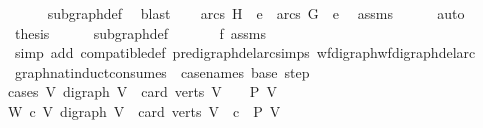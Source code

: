 \begin{isabellebody}
\ \ \ \ \isamarkupfalse%
\ subgraph{\isacharunderscore}{\kern0pt}def\ \isamarkupfalse%
\ blast\isanewline
\ \ \isamarkupfalse%
\ {\isachardoublequoteopen}arcs\ H\ {\isacharminus}{\kern0pt}\ {\isacharbraceleft}{\kern0pt}e{}{\isacharbraceright}{\kern0pt}\ {\isasymsubseteq}\ arcs\ G\ {\isacharminus}{\kern0pt}\ {\isacharbraceleft}{\kern0pt}e{}{\isacharbraceright}{\kern0pt}{\isachardoublequoteclose}\ \isamarkupfalse%
\ assms{\isacharparenleft}{\kern0pt}{}{\isacharparenright}{\kern0pt}\isanewline
\ \ \ \ \isamarkupfalse%
\ auto\isanewline
\ \ \isamarkupfalse%
\ \isamarkupfalse%
\ {\isacharquery}{\kern0pt}thesis\isanewline
\ \ \ \ \isamarkupfalse%
\ subgraph{\isacharunderscore}{\kern0pt}def\ \isanewline
\ \ \ \ \isamarkupfalse%
\ f{}\ assms{\isacharparenleft}{\kern0pt}{}{\isacharparenright}{\kern0pt}\ \isamarkupfalse%
\ {\isacharparenleft}{\kern0pt}simp\ add{\isacharcolon}{\kern0pt}\ compatible{\isacharunderscore}{\kern0pt}def\ pre{\isacharunderscore}{\kern0pt}digraph{\isachardot}{\kern0pt}del{\isacharunderscore}{\kern0pt}arc{\isacharunderscore}{\kern0pt}simps\ wf{\isacharunderscore}{\kern0pt}digraph{\isachardot}{\kern0pt}wf{\isacharunderscore}{\kern0pt}digraph{\isacharunderscore}{\kern0pt}del{\isacharunderscore}{\kern0pt}arc{\isacharparenright}{\kern0pt}\isanewline
{}\isamarkupfalse%
%
\endisatagproof
{\isafoldproof}%
%
\isadelimproof
\isanewline
%
\endisadelimproof
\isanewline
{}\isamarkupfalse%
\ graph{\isacharunderscore}{\kern0pt}nat{\isacharunderscore}{\kern0pt}induct{\isacharbrackleft}{\kern0pt}consumes\ {}{\isacharcomma}{\kern0pt}\ case{\isacharunderscore}{\kern0pt}names\ base\ step{\isacharbrackright}{\kern0pt}{\isacharcolon}{\kern0pt}\ \isanewline
\ \ \isanewline
\isanewline
cases{\isacharcolon}{\kern0pt}\ {\isachardoublequoteopen}{\isasymAnd}V{\isachardot}{\kern0pt}\ {\isacharparenleft}{\kern0pt}digraph\ V\ {\isasymLongrightarrow}\ card\ {\isacharparenleft}{\kern0pt}verts\ V{\isacharparenright}{\kern0pt}\ {\isacharequal}{\kern0pt}\ {}\ {\isasymLongrightarrow}\ P\ V{\isacharparenright}{\kern0pt}{\isachardoublequoteclose}\isanewline
{\isachardoublequoteopen}{\isasymAnd}W\ c{\isachardot}{\kern0pt}\ {\isacharparenleft}{\kern0pt}{\isasymAnd}V{\isachardot}{\kern0pt}\ {\isacharparenleft}{\kern0pt}digraph\ V\ {\isasymLongrightarrow}\ card\ {\isacharparenleft}{\kern0pt}verts\ V{\isacharparenright}{\kern0pt}\ {\isacharequal}{\kern0pt}\ c\ {\isasymLongrightarrow}\ P\ V{\isacharparenright}{\kern0pt}{\isacharparenright}{\kern0pt}\ \isanewline

\end{isabellebody}
